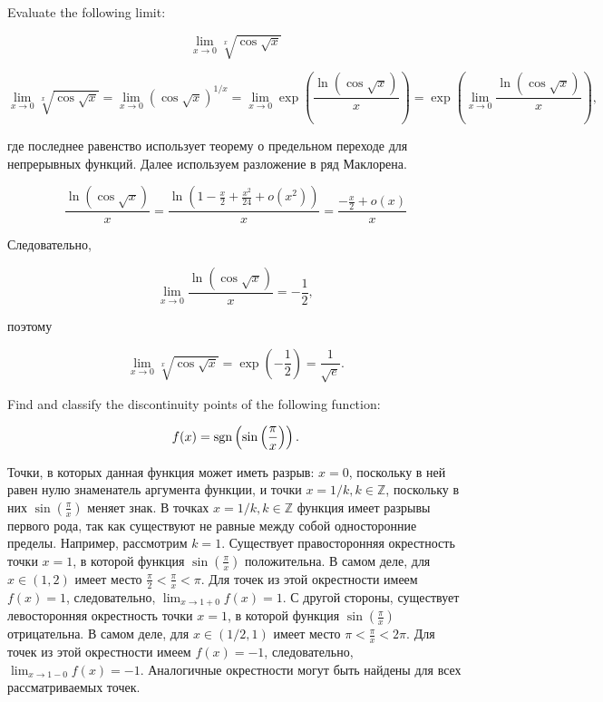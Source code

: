 \documentclass[addpoints]{exam} %
\DeclareMathOperator{\sgn}{\rm sgn}
\begin{document}
\begin{questions}

\question[10] Evaluate the following limit:

\[
\lim_{x \to 0} \sqrt[x]{\cos \sqrt{x}}
\]

\begin{solution}

\[
\lim_{x \rightarrow 0} \sqrt[x]{\cos \sqrt{x}} = \lim_{x \rightarrow 0} \left({\cos \sqrt{x}}\right) ^{1/x} =  \lim_{x \rightarrow 0} \exp
\left( \frac{\ln (\cos \sqrt{x})}{x} \right) = \exp \left( \lim_{x \rightarrow 0}
\frac{\ln (\cos \sqrt{x})}{x} \right),
\]

\noindent где последнее равенство использует теорему о предельном переходе для непрерывных функций. Далее используем разложение в ряд Маклорена.

\[
\frac{\ln (\cos \sqrt{x})}{x} = \frac{\ln (1-
\frac{x}{2}+\frac{x^2}{24}+o(x^2))}{x} = \frac{-\frac{x}{2}+o(x)}{x}
\]

\noindent Следовательно,

\[
\lim_{x \rightarrow 0} \frac{\ln (\cos \sqrt{x})}{x} = -\frac{1}{2},
\]

\noindent поэтому

\[
\lim_{x \rightarrow 0} \sqrt[x]{\cos \sqrt{x}} = \exp \left( -\frac{1}{2}\right) = \frac{1}{\sqrt{e}}.
\]
\end{solution}

\question[10] Find and classify the discontinuity points of the following function:

\[
f(x) = {\sgn} \left(\sin \left( \frac{\pi}{x}\right)\right).
\]

\begin{solution}
Точки, в которых данная функция может иметь разрыв: $x=0$, поскольку в ней равен нулю знаменатель аргумента функции, и точки $x=1/k, k \in \mathbb{Z}$, поскольку в них $\sin \left( \frac{\pi}{x}\right)$ меняет знак. В точках $x=1/k, k \in \mathbb{Z}$ функция имеет разрывы первого рода, так как существуют не равные между собой односторонние пределы. Например, рассмотрим $k=1$. Существует правосторонняя окрестность точки $x=1$, в которой функция $\sin \left( \frac{\pi}{x} \right)$ положительна. В самом деле, для $x \in (1,2)$ имеет место $\frac{\pi}{2} < \frac{\pi}{x} < \pi$. Для точек из этой окрестности имеем $f(x) = 1$, следовательно, $\lim_{x \rightarrow 1+0} f(x) = 1$. С другой стороны, существует левосторонняя окрестность точки $x=1$, в которой функция $\sin \left( \frac{\pi}{x} \right)$ отрицательна. В самом деле, для $x \in (1/2,1)$ имеет место $\pi < \frac{\pi}{x} < 2 \pi$. Для точек из этой окрестности имеем $f(x) = -1$, следовательно, $\lim_{x \rightarrow 1-0} f(x) = -1$. Аналогичные окрестности могут быть найдены для всех рассматриваемых точек.




\end{solution}
\end{questions}
\end{document}
